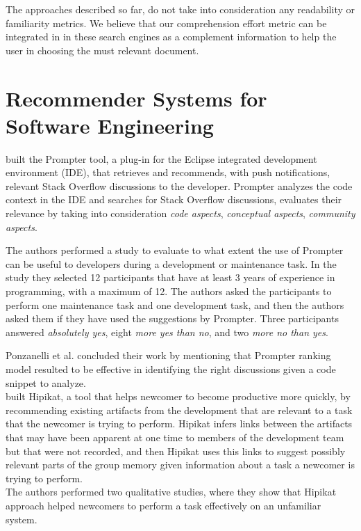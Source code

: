 \documentclass[12pt,mscthesis]{usiinfthesis}
\begin{document}
	The approaches described so far, do not take into consideration any readability or familiarity metrics. We believe that our comprehension effort metric can be integrated in in these search engines as a complement information to help the user in choosing the must relevant document.
	
	\section{Recommender Systems for Software Engineering}

	\citet{Ponz2014b} built the Prompter tool, a plug-in for the Eclipse integrated development environment (IDE), that retrieves and recommends, with push notifications, relevant Stack Overflow discussions to the developer. Prompter analyzes the code context in the IDE and searches for Stack Overflow discussions, evaluates their relevance by taking into consideration \emph{code aspects}, \emph{conceptual aspects}, \emph{community aspects}.


	The authors performed a study to evaluate to what extent the use of Prompter can be useful to developers during a development or maintenance task. In the study they selected 12 participants that have at least 3 years of experience in programming, with a maximum of 12. The authors asked the participants to perform one maintenance task and one development task, and then the authors asked them if they have used the suggestions by Prompter. Three participants answered \emph{absolutely yes}, eight \emph{more yes than no}, and two \emph{more no than yes}.


	Ponzanelli et al. concluded their work by mentioning that Prompter ranking model resulted to be effective in identifying the right discussions given a code snippet to analyze.\\


	\citet{Cubranic:2003:HRP:776816.776866} built Hipikat, a tool that helps newcomer to become productive more quickly, by recommending existing artifacts from the development that are relevant to a task that the newcomer is trying to perform. Hipikat infers links between the artifacts that may have been apparent at one time to members of the development team but that were not recorded, and then Hipikat uses this links to suggest possibly relevant parts of the group memory given information about a task a newcomer is trying to perform.\\
	The authors performed two qualitative studies, where they show that Hipikat approach helped newcomers to perform a task effectively on an unfamiliar system.\\
\end{document}
